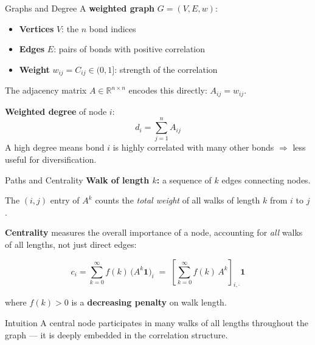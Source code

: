 \documentclass[aspectratio=169]{beamer}
\begin{document}
\begin{frame}{Graphs and Degree}
    A \textbf{weighted graph} $G = (V, E, w)$:
    \begin{itemize}
        \item \textbf{Vertices} $V$: the $n$ bond indices
        \item \textbf{Edges} $E$: pairs of bonds with positive correlation
        \item \textbf{Weight} $w_{ij} = C_{ij} \in (0, 1]$: strength of the correlation
    \end{itemize}

    \bigskip
    The adjacency matrix $A \in \mathbb{R}^{n \times n}$ encodes this directly: $A_{ij} = w_{ij}$.

    \bigskip
    \textbf{Weighted degree} of node $i$:
    \[
        d_i = \sum_{j=1}^{n} A_{ij}
    \]
    A high degree means bond $i$ is highly correlated with many other bonds
    $\Rightarrow$ less useful for diversification.
\end{frame}

\begin{frame}{Paths and Centrality}
    \textbf{Walk of length $k$:} a sequence of $k$ edges connecting nodes.

    \medskip
    The $(i,j)$ entry of $A^k$ counts the \emph{total weight} of all walks of length $k$ from $i$ to $j$.

    \bigskip
    \textbf{Centrality} measures the overall importance of a node, accounting for
    \emph{all} walks of all lengths, not just direct edges:

    \[
        c_i = \sum_{k=0}^{\infty} f(k)\, \bigl(A^k \mathbf{1}\bigr)_i
        \;=\; \left[\sum_{k=0}^{\infty} f(k)\, A^k\right]_{\!i,\cdot} \mathbf{1}
    \]

    where $f(k) > 0$ is a \textbf{decreasing penalty} on walk length.

    \bigskip
    \begin{block}{Intuition}
        A central node participates in many walks of all lengths throughout the graph
        — it is deeply embedded in the correlation structure.
    \end{block}
\end{frame}
\end{document}
